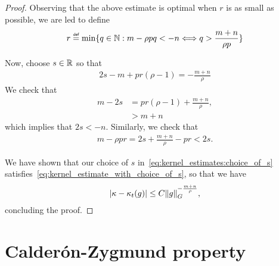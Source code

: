 \begin{proof}
    Observing that the above estimate is optimal when $r$ is as small as possible,
    we are led to define
    \begin{align*}
        r \defeq \min \{q \in \N : m - \rho p q < -n \Longleftrightarrow q > \frac{m + n} {\rho p}\}
    \end{align*}

    Now, choose $s \in \R$ so that
    \begin{align}
        2s - m + p r (\rho - 1) = - \frac {m + n} \rho
        \label{eq:kernel_estimates:choice_of_s}
    \end{align}
    We check that
    \begin{align*}
        m - 2s &= p r (\rho - 1) + \frac {m + n} \rho,\\
        &> m + n
    \end{align*}
    which implies that $2 s < -n$.
    Similarly,
    we check that
    \begin{align*}
        m - \rho p r = 2s + \frac {m + n} \rho - p r
        < 2 s.
    \end{align*}

    We have shown that our choice of $s$ in~\eqref{eq:kernel_estimates:choice_of_s} satisfies~\eqref{eq:kernel_estimate_with_choice_of_s},
    so that we have
    \begin{align*}
        \abs {\kappa - \kappa_t(g)}
        \leq C \norm [\Group] g^{-\frac{m + n} \rho},
    \end{align*}
    concluding the proof.
\end{proof}

\section{Calder\'on-Zygmund property}
